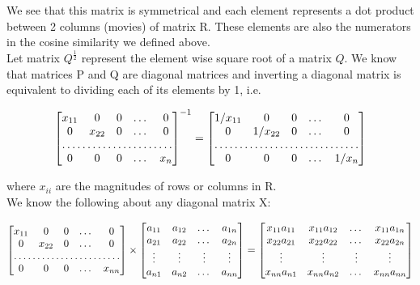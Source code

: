 \documentclass[11pt]{article}
\begin{document}
{We see that this matrix is symmetrical and each element represents a dot product between 2 columns (movies) of matrix R. These elements are also the numerators in the cosine similarity we defined above. \\

Let matrix $Q^{\frac{1}{2}}$ represent the element wise square root of a matrix $Q$. We know that matrices P and Q are diagonal matrices and inverting a diagonal matrix is equivalent to dividing each of its elements by 1, i.e.

\[
\begin{bmatrix}
    x_{11}   & 0 & 0 & \dots &0 \\
    0   & x_{22} & 0 & \dots & 0 \\
    \hdotsfor{5} \\
    0  & 0 & 0 & \dots & x_{n}
\end{bmatrix}^{-1}
=
\begin{bmatrix}
    1/x_{11}       & 0 & 0 & \dots &0 \\
    0  & 1/x_{22} & 0 & \dots & 0 \\
    \hdotsfor{5} \\
    0   & 0 & 0 & \dots & 1/x_{n}
\end{bmatrix}
\]

where $x_{ii}$ are the magnitudes of rows or columns in R. \\

We know the following about any diagonal matrix X:

\[
\begin{bmatrix}
    x_{11}   & 0 & 0 & \dots &0 \\
    0   & x_{22} & 0 & \dots & 0 \\
    \hdotsfor{5} \\
    0  & 0 & 0 & \dots & x_{nn}
\end{bmatrix} \times
\begin{bmatrix}
	a_{11} & a_{12} & \dots  & a_{1n} \\
    a_{21} & a_{22} & \dots  & a_{2n} \\
    \vdots & \vdots & \vdots & \vdots \\
    a_{n1} & a_{n2} & \dots  & a_{nn}
\end{bmatrix}
=
\begin{bmatrix}
	x_{11}a_{11} & x_{11}a_{12} &  \dots  & x_{11}a_{1n} \\
    x_{22}a_{21} & x_{22}a_{22} & \dots  & x_{22}a_{2n} \\
    \vdots & \vdots & \vdots & \vdots \\
    x_{nn}a_{n1} & x_{nn}a_{n2} & \dots  & x_{nn}a_{nn}
\end{bmatrix}
\]

}
\end{document}
